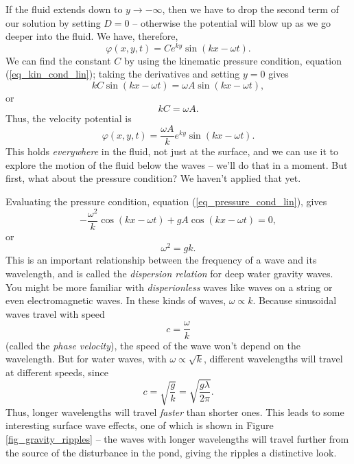 If the fluid extends down to $y \to -\infty$, then we have to drop the second term of our solution by setting $D = 0$ -- otherwise the potential will blow up as we go deeper into the fluid.  We have, therefore, 
\[
\varphi(x, y, t) = C e^{ky} \sin (kx - \omega t).
\]
We can find the constant $C$ by using the kinematic pressure condition, equation (\ref{eq_kin_cond_lin}); taking the derivatives and setting $y = 0$ gives
\[
kC \sin(kx - \omega t) = \omega A \sin (kx - \omega t),
\]
or
\begin{equation}
kC = \omega A.
\end{equation}
Thus, the velocity potential is
\begin{equation}
\label{eq_sin_pot}
\varphi(x, y, t) = \frac{\omega A}{k} e^{ky} \sin (kx - \omega t).
\end{equation}
This holds \emph{everywhere} in the fluid, not just at the surface, and we can use it to explore the motion of the fluid below the waves -- we'll do that in a moment.  But first, what about the pressure condition?  We haven't applied that yet.

Evaluating the pressure condition, equation (\ref{eq_pressure_cond_lin}), gives
\[
-\frac{\omega^2}{k} \cos(kx - \omega t) + gA \cos(kx - \omega t) = 0,
\]
or
\begin{equation}
\label{eq_disp_relation}
\boxed{
\omega^2 = gk.
}
\end{equation}
This is an important relationship between the frequency of a wave and its wavelength, and is called the \emph{dispersion relation} for deep water gravity waves.  You might be more familiar with \emph{disperionless} waves like waves on a string or even electromagnetic waves.  In these kinds of waves, $\omega \propto k$.  Because sinusoidal waves travel with speed
\begin{equation}
c = \frac{\omega}{k}
\end{equation}
(called the \emph{phase velocity}), the speed of the wave won't depend on the wavelength.  But for water waves, with $\omega \propto \sqrt{k}$, different wavelengths will travel at different speeds, since
\[
c = \sqrt{\frac{g}{k}} = \sqrt{\frac{g\lambda}{2\pi}}.
\]
Thus, longer wavelengths will travel \emph{faster} than shorter ones.  This leads to some interesting surface wave effects, one of which is shown in Figure \ref{fig_gravity_ripples} -- the waves with longer wavelengths will travel further from the source of the disturbance in the pond, giving the ripples a distinctive look.

